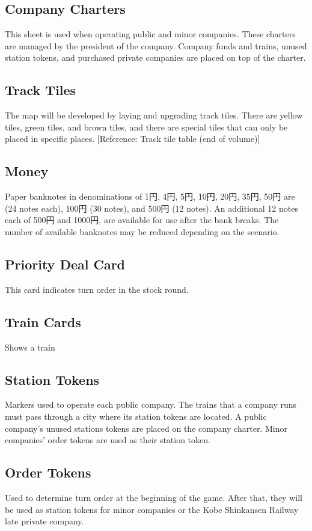 \documentclass{article}
\begin{document}
\begin{CJK}{UTF8}{min}
\begin{multicols}{2}
\subsection{Company Charters}
This sheet is used when operating public and minor companies.  These
charters are managed by the president of the company. Company funds
and trains, unused station tokens, and purchased private companies are
placed on top of the charter.


\subsection{Track Tiles}
The map will be developed by laying and upgrading track tiles. There
are yellow tiles, green tiles, and brown tiles, and there are special
tiles that can only be placed in specific places. [Reference: Track tile
table (end of volume)]


\subsection{Money}
Paper banknotes in denominations of 1円, 4円, 5円, 10円, 20円, 35円,
50円 are (24 notes each), 100円 (30 notes), and 500円 (12 notes). An
additional 12 notes each of 500円 and 1000円, are available for use
after the bank breaks. The number of available banknotes may be
reduced depending on the scenario.

\subsection{Priority Deal Card}
This card indicates turn order in the stock round.


\subsection{Train Cards}
Shows a train

\subsection{Station Tokens}
Markers used to operate each public company. The trains that a company
runs must pass through a city where its station tokens are located. A
public company's unused stations tokens are placed on the company
charter. Minor companies' order tokens are used as their station
token.


\subsection{Order Tokens}
Used to determine turn order at the beginning of the game. After
that, they will be used as station tokens for minor companies or the
Kobe Shinkansen Railway late private company.




\end{multicols}
\end{CJK}
\end{document}
